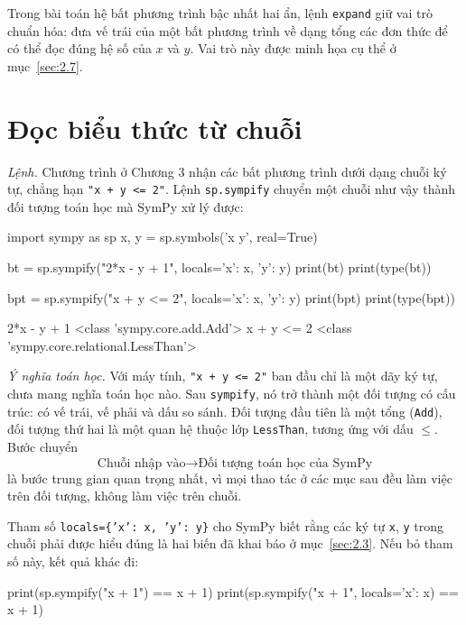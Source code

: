 \documentclass[12pt,a4paper]{report}
\begin{document}
\begin{notebox}
Trong bài toán hệ bất phương trình bậc nhất hai ẩn, lệnh \texttt{expand} giữ vai trò chuẩn hóa: đưa vế trái của một bất phương trình về dạng tổng các đơn thức để có thể đọc đúng hệ số của $x$ và $y$. Vai trò này được minh họa cụ thể ở mục~\ref{sec:2.7}.
\end{notebox}

\section{Đọc biểu thức từ chuỗi}
\label{sec:2.5}

\textit{Lệnh.} Chương trình ở Chương 3 nhận các bất phương trình dưới dạng chuỗi ký tự, chẳng hạn \texttt{"x + y <= 2"}. Lệnh \texttt{sp.sympify} chuyển một chuỗi như vậy thành đối tượng toán học mà SymPy xử lý được:

\begin{madoanbox}
import sympy as sp
x, y = sp.symbols('x y', real=True)

bt = sp.sympify("2*x - y + 1", locals={'x': x, 'y': y})
print(bt)
print(type(bt))

bpt = sp.sympify("x + y <= 2", locals={'x': x, 'y': y})
print(bpt)
print(type(bpt))
\end{madoanbox}

\begin{ketquabox}
2*x - y + 1
<class 'sympy.core.add.Add'>
x + y <= 2
<class 'sympy.core.relational.LessThan'>
\end{ketquabox}

\textit{Ý nghĩa toán học.} Với máy tính, \texttt{"x + y <= 2"} ban đầu chỉ là một dãy ký tự, chưa mang nghĩa toán học nào. Sau \texttt{sympify}, nó trở thành một đối tượng có cấu trúc: có vế trái, vế phải và dấu so sánh. Đối tượng đầu tiên là một tổng (\texttt{Add}), đối tượng thứ hai là một quan hệ thuộc lớp \texttt{LessThan}, tương ứng với dấu $\le$. Bước chuyển
\[
\text{Chuỗi nhập vào} \longrightarrow \text{Đối tượng toán học của SymPy}
\]
là bước trung gian quan trọng nhất, vì mọi thao tác ở các mục sau đều làm việc trên đối tượng, không làm việc trên chuỗi.

Tham số \texttt{locals=\{'x': x, 'y': y\}} cho SymPy biết rằng các ký tự \texttt{x}, \texttt{y} trong chuỗi phải được hiểu đúng là hai biến đã khai báo ở mục~\ref{sec:2.3}. Nếu bỏ tham số này, kết quả khác đi:

\begin{madoanbox}
print(sp.sympify("x + 1") == x + 1)
print(sp.sympify("x + 1", locals={'x': x}) == x + 1)
\end{madoanbox}
\end{document}
